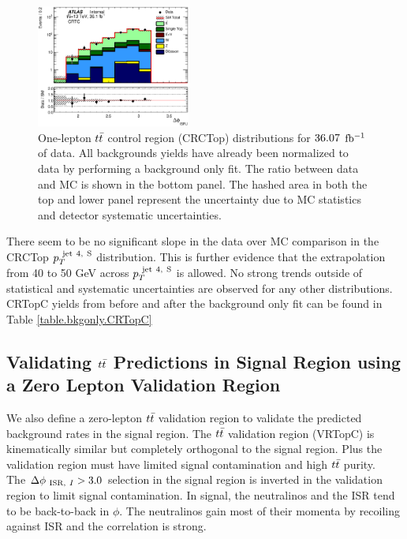 \begin{figure}[h!]
    \includegraphics[width=0.45\textwidth]{figures/ttbar/postfit/CA_dphiISRI_CRTopC_log}
   \caption[One-lepton $\ttbar$ control region (CRTopC) distributions for $\intlumi$ $\ifb$ of data]{One-lepton $\ttbar$ control region (CRCTop) distributions for $\intlumi$ $\ifb$ of data. All backgrounds yields have already been normalized to data by performing a background only fit.  The ratio between data and MC is shown in the bottom panel. The hashed area in both the top and lower panel represent the uncertainty due to MC statistics and detector systematic uncertainties.}
  \label{fig:CRTopC}
\end{figure}

\indent There seem to be no significant slope in the data over MC comparison in the CRCTop $p_{T}^{~\mathrm{jet~4,~S}}$ distribution.  This is further evidence that the extrapolation from 40 to 50 GeV across $p_{T}^{~\mathrm{jet~4,~S}}$ is allowed.  No strong trends outside of statistical and systematic uncertainties are observed for any other distributions. \\

\indent CRTopC yields from before and after the background only fit can be found in Table \ref{table.bkgonly.CRTopC}



\subsection{Validating $\ttbar$ Predictions in Signal Region using a Zero Lepton Validation Region}
\label{sec:Bkg:ttbar:VR}

\indent We also define a zero-lepton $\ttbar$ validation region to validate the predicted background rates in the signal region.  The $\ttbar$ validation region (VRTopC) is kinematically similar but completely orthogonal to the signal region.  Plus the validation region must have limited signal contamination and high $\ttbar$ purity. \\

\indent The $\Delta\phi_{~\mathrm{ISR},~I} > 3.0$ selection in the signal region is inverted in the validation region to limit signal contamination. In signal, the neutralinos and the ISR tend to be back-to-back in $\phi$.  The neutralinos gain most of their momenta by recoiling against ISR and the correlation is strong. \\

